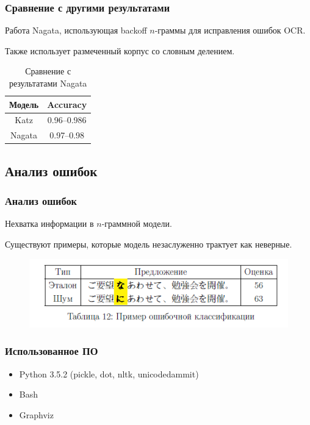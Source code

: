 \documentclass[aspectratio=169, pdf, 9pt, utf8]{beamer}
\begin{document}
\begin{frame}
	\frametitle{Сравнение с другими результатами}
	
	Работа Nagata, использующая backoff $n$-граммы для исправления ошибок OCR.
	
	Также использует размеченный корпус со словным делением.
	
	\begin{table}[H]
		\begin{center}
			
			\begin{tabular}{|c|c|}\hline
				Модель & Accuracy \\ \hline
				Katz			 &  0.96--0.986 \\
				Nagata & 0.97--0.98 \\ \hline 	
			\end{tabular}
			\caption{Сравнение с результатами Nagata}
			\label{table:nagres}
		\end{center}
	\end{table}
	
\end{frame}


\subsection{ Анализ ошибок }

\begin{frame}
	\frametitle{Анализ ошибок}
	
	Нехватка информации в $n$-граммной модели.
	
	Существуют примеры, которые модель незаслуженно трактует как неверные.
			\begin{center}
		\begin{figure}[H]
			\includegraphics{p_err.png}
		\end{figure}
	\end{center}
\end{frame}

\begin{frame}
	\frametitle{Использованное ПО}
	
	\begin{itemize}
		\item Python 3.5.2 (pickle, dot, nltk, unicodedammit)
		
		\item Bash
		
		\item Graphviz
	\end{itemize}
\end{frame}


\begin{frame}
\end{frame}
\end{document}
